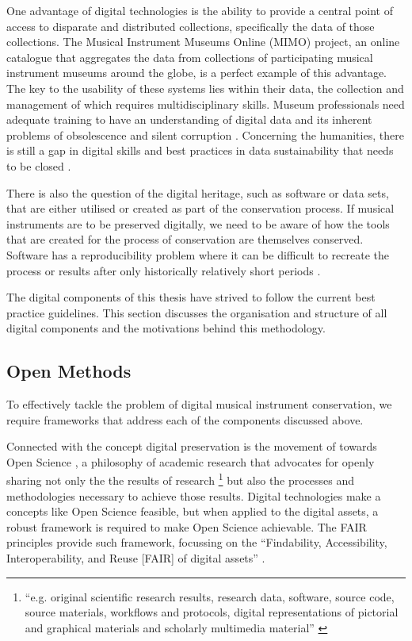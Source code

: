 One advantage of digital technologies is the ability to provide a central point
of access to disparate and distributed collections, specifically the data of
those collections. The Musical Instrument Museums Online (MIMO) project, an
online catalogue that aggregates the data from collections of participating
musical instrument museums around the globe, is a perfect example of this
advantage. The key to the usability \cite{dolan_mimo_2017} of these systems lies
within their data, the collection and management of which requires
multidisciplinary skills. Museum professionals need adequate training to have an
understanding of digital data and its inherent problems of obsolescence and
silent corruption \cite{rubio_work_2020,schwarz_disk_2006,parry_museums_2010}.
Concerning the humanities, there is still a gap in digital skills and best
practices in data sustainability that needs to be closed
\cite{taylor_shaping_2022}. 

There is also the question of the digital heritage, such as software or data
sets, that are either utilised or created as part of the conservation process.
If musical instruments are to be preserved digitally, we need to be aware of how
the tools that are created for the process of conservation are themselves
conserved. Software has a reproducibility problem \cite{perkel_challenge_2020}
where it can be difficult to recreate the process or results after only
historically relatively short periods \cite{robert_reproducibility_2020}.

The digital components of this thesis have strived to follow the current best
practice guidelines. This section discusses the organisation and structure of
all digital components and the motivations behind this methodology.

\subsection{Open Methods}\label{sec:open-methods}

To effectively tackle the problem of digital musical instrument conservation, we
require frameworks that address each of the components discussed above. 

Connected with the concept digital preservation is the movement of towards Open
Science \cite{unesco_open_2021}, a philosophy of academic research that
advocates for openly sharing not only the the results of research%
\footnote{
``e.g. original   scientific   research   results,   research  data,  software,
source  code,  source  materials,  workflows  and  protocols,  digital
representations  of  pictorial  and  graphical  materials   and   scholarly
multimedia   material'' \cite{unesco_open_2021}}
but also the processes and
methodologies necessary to achieve those results. Digital technologies make a
concepts like Open Science feasible, but when applied to the digital assets, a
robust framework is required to make Open Science achievable. The FAIR
principles provide such framework, focussing on the ``Findability,
Accessibility, Interoperability, and Reuse [FAIR] of digital assets''
\cite{wilkinson_fair_2016}.

